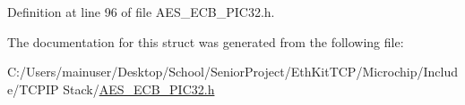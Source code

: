 Definition at line 96 of file A\+E\+S\+\_\+\+E\+C\+B\+\_\+\+P\+I\+C32.\+h.



The documentation for this struct was generated from the following file\+:\begin{DoxyCompactItemize}
\item 
C\+:/\+Users/mainuser/\+Desktop/\+School/\+Senior\+Project/\+Eth\+Kit\+T\+C\+P/\+Microchip/\+Include/\+T\+C\+P\+I\+P Stack/\hyperlink{_a_e_s___e_c_b___p_i_c32_8h}{A\+E\+S\+\_\+\+E\+C\+B\+\_\+\+P\+I\+C32.\+h}\end{DoxyCompactItemize}
